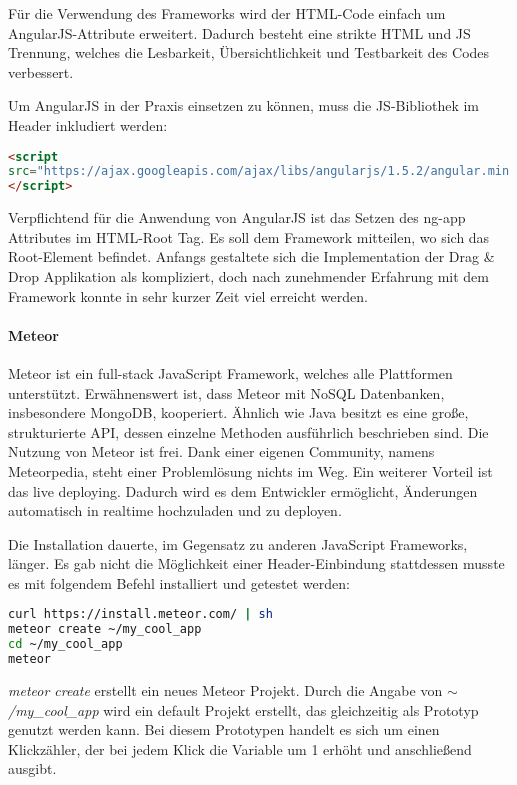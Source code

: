 Für die Verwendung des Frameworks wird der HTML-Code einfach um AngularJS-Attribute erweitert. Dadurch besteht eine strikte HTML und JS Trennung, welches die Lesbarkeit, Übersichtlichkeit und Testbarkeit des Codes verbessert. \cite{ANGULARJS}

Um AngularJS in der Praxis einsetzen zu können, muss die JS-Bibliothek im Header inkludiert werden: 
\begin{lstlisting}[caption={AngularJS einbinden\cite{ANGULARJSDOWN}}, language=HTML]
<script 
src="https://ajax.googleapis.com/ajax/libs/angularjs/1.5.2/angular.min.js">
</script>
\end{lstlisting}

Verpflichtend für die Anwendung von AngularJS ist das Setzen des ng-app Attributes im HTML-Root Tag. Es soll dem Framework mitteilen, wo sich das Root-Element befindet. Anfangs gestaltete sich die Implementation der Drag \& Drop Applikation als kompliziert, doch nach zunehmender Erfahrung mit dem Framework konnte in sehr kurzer Zeit viel erreicht werden.

\paragraph{Meteor}
Meteor ist ein full-stack JavaScript Framework, welches alle Plattformen unterstützt. Erwähnenswert ist, dass Meteor mit NoSQL Datenbanken, insbesondere MongoDB, kooperiert. Ähnlich wie Java besitzt es eine große, strukturierte API, dessen einzelne Methoden ausführlich beschrieben sind. Die Nutzung von Meteor ist frei. Dank einer eigenen Community, namens Meteorpedia, steht einer Problemlösung nichts im Weg. Ein weiterer Vorteil ist das live deploying. Dadurch wird es dem Entwickler ermöglicht, Änderungen automatisch in realtime hochzuladen und zu deployen. \cite{METEOR}

\newpage

Die Installation dauerte, im Gegensatz zu anderen JavaScript Frameworks, länger. Es gab nicht die Möglichkeit einer Header-Einbindung stattdessen musste es mit folgendem Befehl installiert und getestet werden:
\begin{lstlisting}[caption={Installation von Meteor \cite{METEORINSTALL}}, language=bash]
curl https://install.meteor.com/ | sh
meteor create ~/my_cool_app
cd ~/my_cool_app
meteor
\end{lstlisting}

\textit{meteor create} erstellt ein neues Meteor Projekt. Durch die Angabe von \textit{$\sim$/my\_cool\_app} wird ein default Projekt erstellt, das gleichzeitig als Prototyp genutzt werden kann. Bei diesem Prototypen handelt es sich um einen Klickzähler, der bei jedem Klick die Variable um 1 erhöht und anschließend ausgibt.


